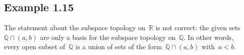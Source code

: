 \subsection{Example 1.15}

The statement about the subspace topology on~$ℝ$ is not correct:
the given sets~$ℚ ∩ (a, b)$ are only a basis for the subspace topology on~$ℚ$.
In other words, every open subset of~$ℚ$ is a union of sets of the form~$ℚ ∩ (a, b)$ with~$a < b$.
